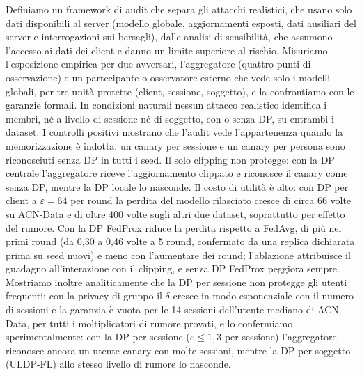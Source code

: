 Definiamo un framework di audit che separa gli attacchi realistici, che usano solo dati
disponibili al server (modello globale, aggiornamenti esposti, dati ausiliari del server e
interrogazioni sui bersagli), dalle analisi di sensibilità, che assumono l'accesso ai dati
dei client e danno un limite superiore al rischio. Misuriamo l'esposizione empirica per due avversari,
l'aggregatore (quattro punti di osservazione) e un partecipante o osservatore esterno che vede
solo i modelli globali, per tre unità protette (client, sessione, soggetto), e la confrontiamo
con le garanzie formali.
In condizioni naturali nessun attacco realistico identifica i membri, né a livello di sessione
né di soggetto, con o senza DP, su entrambi i dataset. I controlli positivi mostrano che
l'audit vede l'appartenenza quando la memorizzazione è indotta: un canary per sessione e un
canary per persona sono riconosciuti senza DP in tutti i seed. Il solo clipping non protegge:
con la DP centrale l'aggregatore riceve l'aggiornamento clippato e riconosce il canary come
senza DP, mentre la DP locale lo nasconde. Il costo di utilità è alto: con DP per client a
$\varepsilon=64$ per round la perdita del modello rilasciato cresce di circa 66 volte su
ACN-Data e di oltre 400 volte sugli altri due dataset, soprattutto per effetto del rumore.
Con la DP FedProx riduce la perdita rispetto a FedAvg, di più nei primi round (da 0,30 a 0,46
volte a 5 round, confermato da una replica dichiarata prima su seed nuovi) e meno con l'aumentare
dei round; l'ablazione attribuisce il guadagno all'interazione con il clipping, e senza DP
FedProx peggiora sempre. Mostriamo inoltre analiticamente che la DP per sessione non protegge gli utenti
frequenti: con la privacy di gruppo il $\delta$ cresce in modo esponenziale con il numero di
sessioni e la garanzia è vuota per le 14 sessioni dell'utente mediano di ACN-Data, per tutti i
moltiplicatori di rumore provati, e lo confermiamo sperimentalmente: con la DP per sessione
($\varepsilon\le1{,}3$ per sessione) l'aggregatore riconosce ancora un utente canary con molte
sessioni, mentre la DP per soggetto (ULDP-FL) allo stesso livello di rumore lo nasconde.

